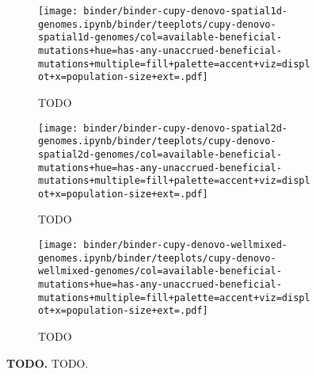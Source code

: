 \begin{sidewaysfigure}[h]
  \rotatesidewayslabel
    \begin{subfigure}[b]{0.32\linewidth}
        \begin{minipage}{\linewidth}
          \texttt{[image: binder/binder-cupy-denovo-spatial1d-genomes.ipynb/binder/teeplots/cupy-denovo-spatial1d-genomes/col=available-beneficial-mutations+hue=has-any-unaccrued-beneficial-mutations+multiple=fill+palette=accent+viz=displot+x=population-size+ext=.pdf]}%
        \end{minipage}
        \begin{minipage}{\linewidth}
        \caption{TODO}
        \label{fig:unaccrued-denovo-cupy:spatial1d}
        \end{minipage}%
    \end{subfigure}%
    \begin{subfigure}[b]{0.32\linewidth}
        \begin{minipage}{\linewidth}
          \texttt{[image: binder/binder-cupy-denovo-spatial2d-genomes.ipynb/binder/teeplots/cupy-denovo-spatial2d-genomes/col=available-beneficial-mutations+hue=has-any-unaccrued-beneficial-mutations+multiple=fill+palette=accent+viz=displot+x=population-size+ext=.pdf]}%
        \end{minipage}
        \begin{minipage}{\linewidth}
        \caption{TODO}
        \label{fig:unaccrued-denovo-cupy:spatial2d}
        \end{minipage}%
    \end{subfigure}%
\begin{subfigure}[b]{0.36\linewidth}
    \begin{minipage}{\linewidth}
      \texttt{[image: binder/binder-cupy-denovo-wellmixed-genomes.ipynb/binder/teeplots/cupy-denovo-wellmixed-genomes/col=available-beneficial-mutations+hue=has-any-unaccrued-beneficial-mutations+multiple=fill+palette=accent+viz=displot+x=population-size+ext=.pdf]}%
    \end{minipage}
    \begin{minipage}{\linewidth}
    \caption{TODO}
    \label{fig:unaccrued-denovo-cupy:wellmixed}
    \end{minipage}%
\end{subfigure}%


  \begin{minipage}{\linewidth}
    \caption{%
      \textbf{TODO.}
      \footnotesize
     TODO.
    }
    \label{fig:unaccrued-denovo-cupy}
  \end{minipage}
\end{sidewaysfigure}
